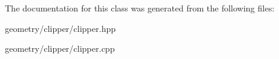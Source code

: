 The documentation for this class was generated from the following files\+:\begin{DoxyCompactItemize}
\item 
geometry/clipper/clipper.\+hpp\item 
geometry/clipper/clipper.\+cpp\end{DoxyCompactItemize}
